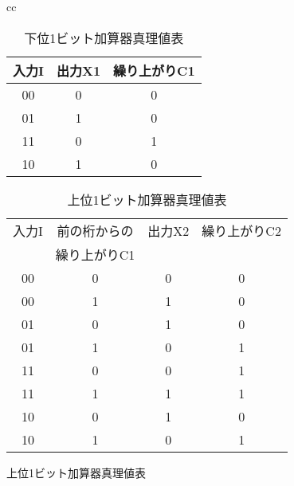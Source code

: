 \begin{enumerate}[(1)]
    \begin{figure}[H]
        \centering
        \begin{tabular}{cc}
            \begin{minipage}{0.4\linewidth}
                \centering
                \begin{table}[H]
                    \caption{下位1ビット加算器真理値表}
                    \centering
                    \begin{tabular}{ccc}
                        \hline
                        入力I & 出力X1 & 繰り上がりC1\\
                        \hline
                        00 & 0 & 0\\
                        01 & 1 & 0\\
                        11 & 0 & 1\\
                        10 & 1 & 0\\
                        \hline
                    \end{tabular}
                \end{table}
            \end{minipage}
            \begin{minipage}{0.5\linewidth}
                \centering
                \begin{table}[H]
                    \caption{上位1ビット加算器真理値表}
                    \centering
                    \begin{tabular}{cccc}
                        \hline
                        入力I & 前の桁からの& 出力X2 & 繰り上がりC2\\
                         & 繰り上がりC1&  & \\
                        \hline
                        00 & 0 & 0 & 0\\
                        00 & 1 & 1 & 0\\
                        01 & 0 & 1 & 0\\
                        01 & 1 & 0 & 1\\
                        11 & 0 & 0 & 1\\
                        11 & 1 & 1 & 1\\
                        10 & 0 & 1 & 0\\
                        10 & 1 & 0 & 1\\
                        \hline
                    \end{tabular}
                \end{table}

\end{minipage}
\end{tabular}
\end{figure}
\end{enumerate}
